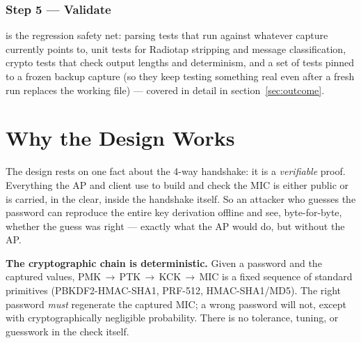 \subsubsection{Step 5 --- Validate}
 is the regression safety net: parsing tests that run against whatever capture  currently points to, unit tests for Radiotap stripping and message classification, crypto tests that check output lengths and determinism, and a set of tests pinned to a frozen backup capture (so they keep testing something real even after a fresh  run replaces the working file) --- covered in detail in section~\ref{sec:outcome}.

\section{Why the Design Works}\label{sec:justify}

The design rests on one fact about the 4-way handshake: it is a \emph{verifiable} proof. Everything the AP and client use to build and check the MIC is either public or is carried, in the clear, inside the handshake itself. So an attacker who guesses the password can reproduce the entire key derivation offline and see, byte-for-byte, whether the guess was right --- exactly what the AP would do, but without the AP.

\begin{whybox}
\textbf{The cryptographic chain is deterministic.} Given a password and the captured values, PMK\,$\rightarrow$\,PTK\,$\rightarrow$\,KCK\,$\rightarrow$\,MIC is a fixed sequence of standard primitives (PBKDF2-HMAC-SHA1, PRF-512, HMAC-SHA1/MD5). The right password \emph{must} regenerate the captured MIC; a wrong password will not, except with cryptographically negligible probability. There is no tolerance, tuning, or guesswork in the check itself.
\end{whybox}

